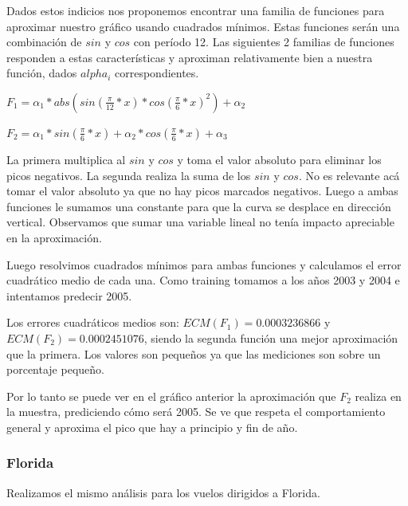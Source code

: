 Dados estos indicios nos proponemos encontrar una familia de funciones para aproximar nuestro gráfico usando cuadrados mínimos. Estas funciones serán una combinación de $sin$ y $cos$ con período 12. Las siguientes 2 familias de funciones responden a estas características y aproximan relativamente bien a nuestra función, dados $alpha_i$ correspondientes.


$F_1 = \alpha_1 * abs(sin(\frac{\pi}{12}*x) * cos(\frac{\pi}{6}*x)^2) + \alpha_2$

$F_2 = \alpha_1 * sin(\frac{\pi}{6}*x) + \alpha_2 * cos(\frac{\pi}{6}*x) + \alpha_3$


La primera multiplica al $sin$ y $cos$ y toma el valor absoluto para eliminar los picos negativos. La segunda realiza la suma de los $sin$ y $cos$. No es relevante acá tomar el valor absoluto ya que no hay picos marcados negativos. Luego a ambas funciones le sumamos una constante para que la curva se desplace en dirección vertical. Observamos que sumar una variable lineal no tenía impacto apreciable en la aproximación. 

Luego resolvimos cuadrados mínimos para ambas funciones y calculamos el error cuadrático medio de cada una. Como training tomamos a los años 2003 y 2004 e intentamos predecir 2005.

Los errores cuadráticos medios son: $ECM(F_1) = 0.0003236866$ y $ECM(F_2) = 0.0002451076$, siendo la segunda función una mejor aproximación que la primera. Los valores son pequeños ya que las mediciones son sobre un porcentaje pequeño.

Por lo tanto se puede ver en el gráfico anterior la aproximación que $F_2$ realiza en la muestra, prediciendo cómo será 2005. Se ve que respeta el comportamiento general y aproxima el pico que hay a principio y fin de año.

\subsubsection{Florida}

Realizamos el mismo análisis para los vuelos dirigidos a Florida. 












